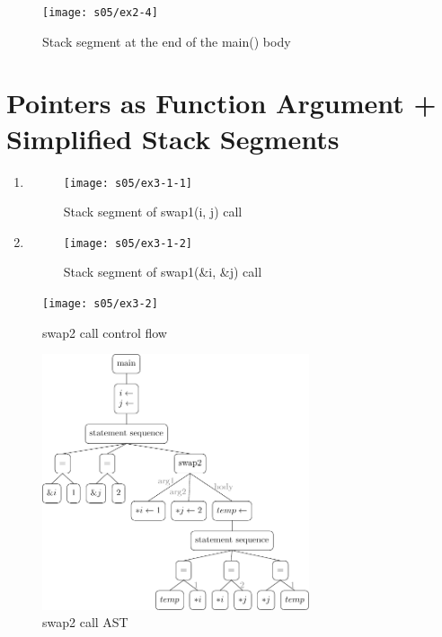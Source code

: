 
\begin{figure}[H]
    \center
    \texttt{[image: s05/ex2-4]}
    \caption{Stack segment at the end of the main() body\label{fig:ex2-4}}
\end{figure}


%
%
\bigskip
\bigskip
\section{Pointers as Function Argument + Simplified Stack Segments}


\begin{enumerate}[label={\questioncolor1.\arabic*.}]
    \item {}

    \begin{figure}[H]
        \center
        \texttt{[image: s05/ex3-1-1]}
        \caption{Stack segment of swap1(i, j) call\label{fig:ex3-1-1}}
    \end{figure}

    \pagebreak
    \item {}

    \begin{figure}[H]
        \center
        \texttt{[image: s05/ex3-1-2]}
        \caption{Stack segment of swap1(\&i, \&j) call\label{fig:ex3-1-2}}
    \end{figure}
\end{enumerate}


\begin{figure}[H]
    \center
    \texttt{[image: s05/ex3-2]}
    \caption{swap2 call control flow\label{fig:ex3-2}}
\end{figure}

\begin{figure}[H]
    \center
    \includegraphics[width=0.7\textwidth]{ex3-2-swap-ast/swap-ast}
    \caption{swap2 call AST\label{fig:swap2-ast}}
\end{figure}


